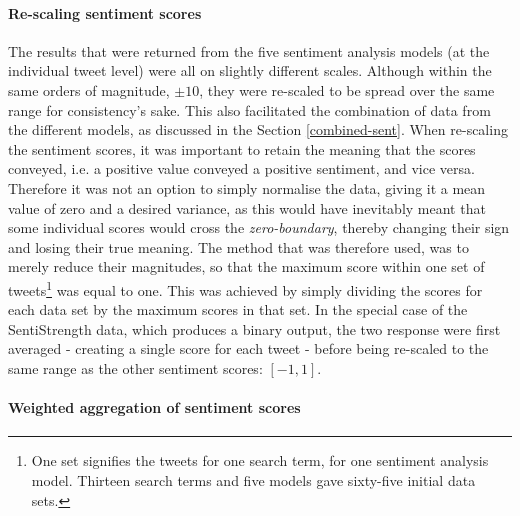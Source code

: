 \documentclass{article}
\begin{document}
\paragraph{Re-scaling sentiment scores \label{rescaling-sent}}
\label{sec-1-2-1-1}

The results that were returned from the five sentiment analysis models (at the individual tweet level) were all on slightly different scales. Although within the same orders of magnitude, $\pm 10$, they were re-scaled to be spread over the same range for consistency's sake. This also facilitated the combination of data from the different models, as discussed in the Section \ref{combined-sent}. When re-scaling the sentiment scores, it was important to retain the meaning that the scores conveyed, i.e. a positive value conveyed a positive sentiment, and vice versa. Therefore it was not an option to simply normalise the data, giving it a mean value of zero and a desired variance, as this would have inevitably meant that some individual scores would cross the \emph{zero-boundary}, thereby changing their sign and losing their true meaning. The method that was therefore used, was to merely reduce their magnitudes, so that the maximum score within one set of tweets\footnote{One set signifies the tweets for one search term, for one sentiment analysis model. Thirteen search terms and five models gave sixty-five initial data sets.} was equal to one. This was achieved by simply dividing the scores for each data set by the maximum scores in that set. In the special case of the SentiStrength data, which produces a binary output, the two response were first averaged - creating a single score for each tweet - before being re-scaled to the same range as the other sentiment scores: $[-1, 1]$.


\paragraph{Weighted aggregation of sentiment scores \label{weighting-sentiment}}
\label{sec-1-2-1-2}
\end{document}
